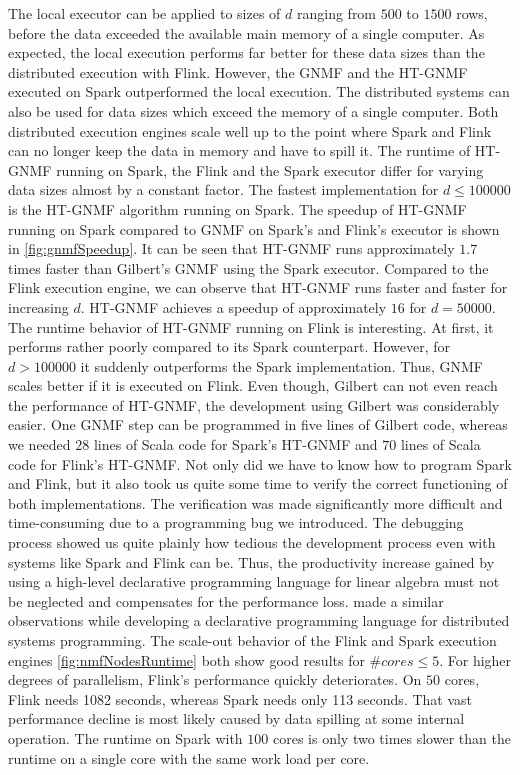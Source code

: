 The local executor can be applied to sizes of $d$ ranging from $500$ to $1500$ rows, before the data exceeded the available main memory of a single computer.
As expected, the local execution performs far better for these data sizes than the distributed execution with Flink.
However, the GNMF and the HT-GNMF executed on Spark outperformed the local execution.
The distributed systems can also be used for data sizes which exceed the memory of a single computer.
Both distributed execution engines scale well up to the point where Spark and Flink can no longer keep the data in memory and have to spill it.
The runtime of HT-GNMF running on Spark, the Flink and the Spark executor differ for varying data sizes almost by a constant factor.
The fastest implementation for $d\le 100000$ is the HT-GNMF algorithm running on Spark.
The speedup of HT-GNMF running on Spark compared to GNMF on Spark's and Flink's executor is shown in \cref{fig:gnmfSpeedup}.
It can be seen that HT-GNMF runs approximately $1.7$ times faster than Gilbert's GNMF using the Spark executor.
Compared to the Flink execution engine, we can observe that HT-GNMF runs faster and faster for increasing $d$.
HT-GNMF achieves a speedup of approximately $16$ for $d=50000$.
The runtime behavior of HT-GNMF running on Flink is interesting.
At first, it performs rather poorly compared to its Spark counterpart.
However, for $d>100000$ it suddenly outperforms the Spark implementation.
Thus, GNMF scales better if it is executed on Flink. 
Even though, Gilbert can not even reach the performance of HT-GNMF, the development using Gilbert was considerably easier.
One GNMF step can be programmed in five lines of Gilbert code, whereas we needed $28$ lines of Scala code for Spark's HT-GNMF and $70$ lines of Scala code for Flink's HT-GNMF.
Not only did we have to know how to program Spark and Flink, but it also took us quite some time to verify the correct functioning of both implementations.
The verification was made significantly more difficult and time-consuming due to a programming bug we introduced.
The debugging process showed us quite plainly how tedious the development process even with systems like Spark and Flink can be.
Thus, the productivity increase gained by using a high-level declarative programming language for linear algebra must not be neglected and compensates for the performance loss.
\cite{alvaro:2010a} made a similar observations while developing a declarative programming language for distributed systems programming.
The scale-out behavior of the Flink and Spark execution engines \cref{fig:nmfNodesRuntime} both show good results for $\#cores \le 5$.
For higher degrees of parallelism, Flink's performance quickly deteriorates.
On $50$ cores, Flink needs 1082 seconds, whereas Spark needs only 113 seconds.
That vast performance decline is most likely caused by data spilling at some internal operation.
The runtime on Spark with $100$ cores is only two times slower than the runtime on a single core with the same work load per core.


